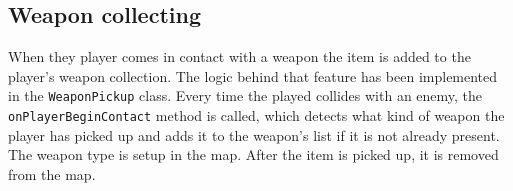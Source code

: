 \documentclass[12p]{article}
\begin{document}

\subsection{Weapon collecting} \label{DocWeaponCollection}

When they player comes in contact with a weapon the item is added to the player's weapon collection. The logic behind that feature has been implemented in the \texttt{WeaponPickup} class. Every time the played collides with an enemy, the \texttt{onPlayerBeginContact} method is called, which detects what kind of weapon the player has picked up and adds it to the weapon's list if it is not already present. The weapon type is setup in the map. After the item is picked up, it is removed from the map.
\end{document}
